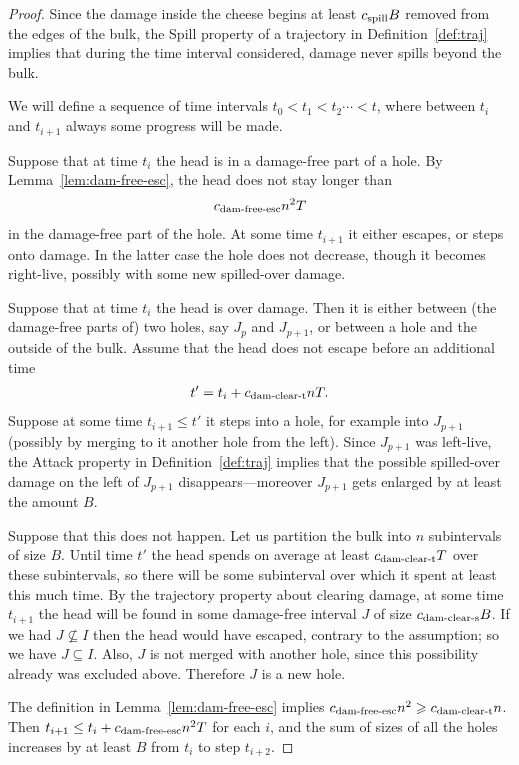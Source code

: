 \documentclass[12pt]{memoir}
\renewcommand{\le}{\leq}
\def\B{B}
\newcommand{\Tu}{T}
\newcommand{\cns}[1]{c_{\textrm{\upshape #1}}}
\newcommand{\cDamFreeEsc}{\cns{dam-free-esc}}
\newcommand{\cDamClearS}{\cns{dam-clear-s}}
\newcommand{\cDamClearT}{\cns{dam-clear-t}}
\newcommand{\cSpill}{\cns{spill}}
\begin{document}
  \begin{proof}
Since the damage inside the cheese begins at least \( \cSpill \B \) removed from the edges 
of the bulk,
the Spill property of a trajectory in Definition~\ref{def:traj} implies
that during the time interval considered, damage never spills beyond the bulk.

We will define a sequence of time intervals \( t_{0}<t_{1}<t_{2}\dotsm<t \),
where between \( t_{i} \) and \( t_{i+1} \) always some progress will be made.

Suppose that at time \( t_{i} \) the head is in a damage-free part of a hole.
By Lemma~\ref{lem:dam-free-esc}, the head does not stay longer than
\begin{align*}
\cDamFreeEsc n^{2}\Tu
 \end{align*}
in the damage-free part of the hole.
At some time \( t_{i+1} \) it either escapes, or steps onto damage. 
In the latter case the hole does not decrease, though it becomes right-live, 
possibly with some new spilled-over damage.

Suppose that at time \( t_{i} \) the head is over damage.
Then it is either between (the damage-free parts of)
two holes, say \( J_{p} \) and \( J_{p+1} \), 
or between a hole and the outside of the bulk.
Assume that the head does not escape before an additional time
\begin{align*}
 t'=t_{i}+\cDamClearT n\Tu.
 \end{align*}
Suppose at some time \( t_{i+1} \le t' \) 
it steps into a hole, for example into \( J_{p+1} \) (possibly by merging to it
another hole from the left).
Since \( J_{p+1} \) was left-live, the Attack property in 
Definition~\ref{def:traj} implies that the possible spilled-over damage 
on the left of \( J_{p+1} \) disappears---moreover \( J_{p+1} \)
gets enlarged by at least the amount \( \B \).

Suppose that this does not happen.
Let us partition the bulk into \( n \) subintervals of size \( \B \).
Until time \( t' \) the head spends on average at least
\( \cDamClearT \Tu \) over these subintervals,  so 
there will be some subinterval over which it spent 
at least this much time.
By the trajectory property about clearing damage, 
at some time \( t_{i+1} \) the head will be found in some damage-free
interval \( J \) of size \( \cDamClearS \B \).
If we had \( J\not\subseteq I \) then the head would have escaped, 
contrary to the assumption; so we have \( J\subseteq I \).
Also, \( J \) is not merged with another hole, since this
possibility already was excluded above.
Therefore \( J \) is a new hole.

\begin{sloppypar}
The definition in Lemma~\ref{lem:dam-free-esc} implies
\( \cDamFreeEsc n^{2} \ge \cDamClearT n \).
Then \( t_{i+1}\le t_{i}+\cDamFreeEsc n^{2}\Tu \) 
for each \( i \), and the sum of sizes of all the holes
increases by at least \( \B \) from \( t_{i} \) to step \( t_{i+2} \).
  \end{sloppypar}
 \end{proof}
\end{document}
